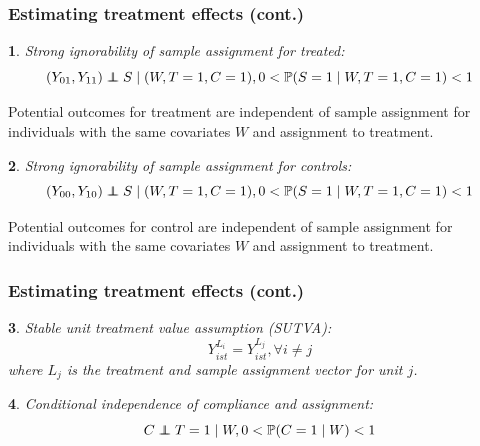 \documentclass{beamer}
\makeatletter
\newtheorem*{assumption*}{\assumptionnumber}
\providecommand{\assumptionnumber}{}
\newenvironment{assumption}[2]
 {%
  \renewcommand{\assumptionnumber}{Assumption #1}%
  \begin{assumption*}%
  \protected@edef\@currentlabel{#1}%
 }
 {%
  \end{assumption*}
 }
\newcommand{\pr}{\mathbb{P}} %
\newcommand\independent{\protect\mathpalette{\protect\independenT}{\perp}}
\def\independenT#1#2{\mathrel{\rlap{$#1#2$}\mkern2mu{#1#2}}}
\makeatother
\begin{document}
\begin{frame}
\frametitle{Estimating treatment effects (cont.)}
\begin{assumption}{2}{}\label{si_treat}
Strong ignorability of sample assignment for treated:
\begin{equation*}
(Y_{01}, Y_{11}) \independent S \mid (W, T=1,C = 1), 0 < \pr(S=1 \mid W, T=1,C = 1) <1 
\end{equation*}
\end{assumption}
\noindent Potential outcomes for treatment are independent of sample assignment for individuals with the same covariates $W$ and assignment to treatment.

\begin{assumption}{3}{}\label{si_ctrl}
Strong ignorability of sample assignment for controls:
\begin{equation*}
(Y_{00}, Y_{10}) \independent S \mid (W, T=1,C = 1), 0 < \pr(S=1 \mid W, T=1,C = 1) <1 
\end{equation*}\end{assumption}

\noindent Potential outcomes for control are independent of sample assignment for individuals with the same covariates $W$ and assignment to treatment.
\end{frame}

\begin{frame}
\frametitle{Estimating treatment effects (cont.)}
\begin{assumption}{4}{}\label{sutva}
Stable unit treatment value assumption (SUTVA):
\begin{equation*}
Y_{ist}^{L_i} = Y_{ist}^{L_j},  \forall i \neq j
\end{equation*}
where $L_j$ is the treatment and sample assignment vector for unit $j$. \end{assumption}
 
\begin{assumption}{5}{}\label{compl}
Conditional independence of compliance and assignment:
\begin{equation*}
C \independent T=1 \mid W, 0 < \pr(C = 1 \mid W) < 1
\end{equation*}
\end{assumption}
\end{frame}
\end{document}
